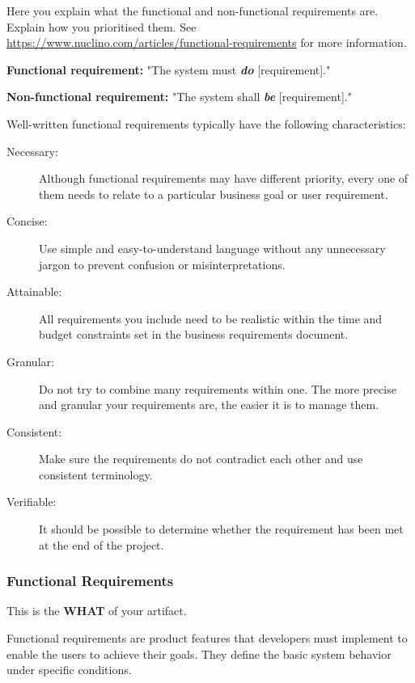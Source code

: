 Here you explain what the functional and non-functional requirements are. Explain how you prioritised them. 
  See \url{https://www.nuclino.com/articles/functional-requirements} for more information. 

   \textbf{Functional requirement:} "The system must \textbf{\emph{do}} [requirement]."

    \textbf{Non-functional requirement:} "The system shall \textbf{\emph{be}} [requirement]."


Well-written functional requirements typically have the following characteristics:
\begin{description}



    \item[Necessary:] Although functional requirements may have different priority, every one of them needs to relate to a particular business goal or user requirement.

  \item[Concise:] Use simple and easy-to-understand language without any unnecessary jargon to prevent confusion or misinterpretations.

 \item[Attainable:] All requirements you include need to be realistic within the time and budget constraints set in the business requirements document.

 \item[Granular:] Do not try to combine many requirements within one. The more precise and granular your requirements are, the easier it is to manage them.

 \item[Consistent:] Make sure the requirements do not contradict each other and use consistent terminology.

 \item[Verifiable:] It should be possible to determine whether the requirement has been met at the end of the project.
    \end{description}

\subsubsection{Functional Requirements}
This is the \textbf{WHAT} of your artifact.

Functional requirements are product features that developers must implement to enable the users to achieve their goals. They define the basic system behavior under specific conditions. 

